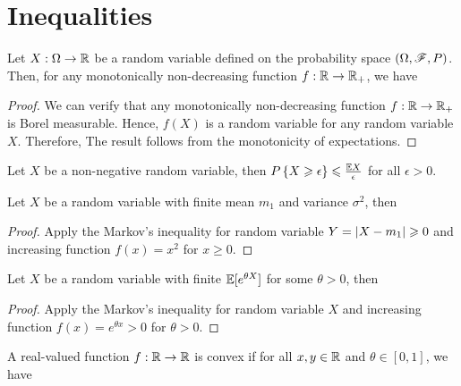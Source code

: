 \documentclass[letterpaper,10pt,english]{article}
\begin{document}
\section{Inequalities}
\begin{thm}
Let $X: \Omega \to \mathbb{R}$ be a random variable defined on the probability space $(\Omega, \mathscr{F}, P)$. 
Then, for any monotonically non-decreasing function $f: \mathbb{R} \to \mathbb{R}_+$, we have 
\end{thm}
\begin{proof} 
We can verify that any monotonically non-decreasing function $f: \mathbb{R} \to \mathbb{R}_+$ is Borel measurable. 
Hence,  $f(X)$ is a random variable for any random variable $X$. 
Therefore, 
The result follows from the monotonicity of expectations. 
\end{proof}
\begin{cor}[Markov] 
Let $X$ be a non-negative random variable, then $P\left\{X \geqslant \epsilon\right\} \leqslant \frac{\mathbb{E} X}{\epsilon}$ for all $\epsilon  > 0$.
\end{cor}
\begin{cor}[Chebychev] 
Let $X$ be a random variable with finite mean $m_1$ and variance $\sigma^2$, 
then 
\end{cor}
\begin{proof} 
Apply the Markov's inequality for random variable $Y = \left\lvert X-m_1\right\rvert \geqslant 0$ and increasing function $f(x) = x^2$ for $x \ge 0$. 
\end{proof}
\begin{cor}[Chernoff] 
Let $X$ be a random variable with finite $\mathbb{E}[e^{\theta X}]$ for some $\theta>0$, 
then 
\end{cor}
\begin{proof} 
Apply the Markov's inequality for random variable $X$ and increasing function $f(x) = e^{\theta x} > 0$ for $\theta > 0$. 
\end{proof}
\begin{defn} 
A real-valued function $f: \mathbb{R} \to \mathbb{R}$ is convex if for all $x, y\in \mathbb{R}$ and $\theta \in [0,1]$, we have 
\end{defn}
\end{document}
